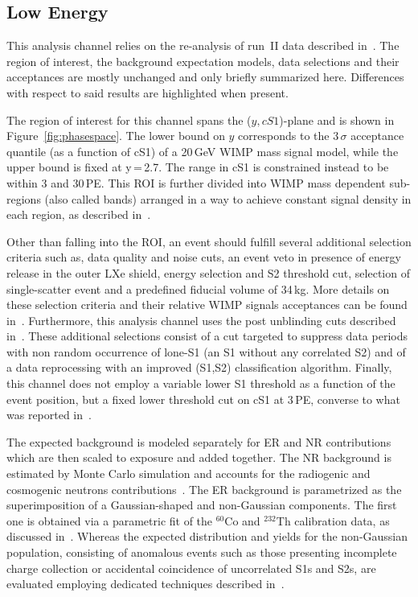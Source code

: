 
\subsection{Low Energy}
\label{subsec:LowE}
This analysis channel relies on the re-analysis of run~II data described in~\cite{xe100_run_combination}. The region of interest, the background 
expectation models, data selections and their acceptances are mostly unchanged and only briefly summarized here. Differences with respect to said results are highlighted when present.

The region of interest for this channel spans the ($y,cS1$)-plane and is shown in Figure~\ref{fig:phasespace}.  The lower 
bound on $y$ corresponds to the 3\,$\sigma$ acceptance quantile (as a function of cS1) of a 20\,GeV WIMP mass signal model, while the upper bound is fixed at y\,=\,2.7.
The range in cS1 is constrained instead to be within 3 and 30\,PE. This  ROI is further divided into WIMP mass dependent sub-regions (also called bands) arranged in a way 
to achieve constant signal density in each region, as described in~\cite{xe100_run_combination}.

Other than falling into the ROI, an event should fulfill several additional selection criteria such as, data quality and noise cuts,
an event veto in presence of energy release in the outer LXe shield, energy selection and S2 threshold cut,
selection of single-scatter event and a predefined fiducial volume of 34\,kg. More details on these selection criteria and their 
relative WIMP signals acceptances can be found in~\cite{Aprile:2012vw,xe100_run_combination}. 
Furthermore, this analysis channel uses the post unblinding cuts described in~\cite{xe100_run_combination}. 
These additional selections consist of a cut targeted to suppress data periods with non random occurrence of lone-S1 (an S1 without 
any correlated S2) and of a data reprocessing with an improved (S1,S2) classification algorithm.
Finally, this channel does not employ a variable lower S1 threshold as a function of the event position, but a fixed 
lower threshold cut on cS1 at 3\,PE, converse to what was reported in~\cite{xe100_run_combination}.

The expected background is modeled separately for ER and NR contributions which are then scaled to exposure and added together.
The NR background is estimated by Monte Carlo simulation and accounts for the radiogenic and cosmogenic neutrons
contributions~\cite{Aprile:2013tov}.
The ER background is parametrized as the superimposition of a Gaussian-shaped and non-Gaussian components.
The first one is obtained via a parametric fit of the $^{60}$Co and $^{232}$Th calibration data, as discussed in~\cite{xe100_run10_si}.
Whereas the expected distribution and yields for the non-Gaussian population, consisting of anomalous events such as those 
presenting incomplete charge collection or accidental coincidence of uncorrelated S1s and S2s,  
are evaluated employing dedicated techniques described in~\cite{xe100_run_combination}.

